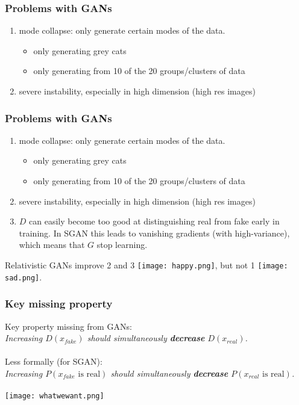 \documentclass[t]{beamer}
\begin{document}
\begin{frame}
	\frametitle{Problems with GANs}
	
	\begin{enumerate}
		\item mode collapse: only generate certain modes of the data.
		\begin{itemize}
			\item only generating grey cats
			\item only generating from 10 of the 20 groups/clusters of data
		\end{itemize}
		\item severe instability, especially in high dimension (high res images)
	\end{enumerate}
	
\end{frame}


\begin{frame}
	\frametitle{Problems with GANs}
	
	\begin{enumerate}
		\item mode collapse: only generate certain modes of the data.
		\begin{itemize}
			\item only generating grey cats
			\item only generating from 10 of the 20 groups/clusters of data
		\end{itemize}
		\item severe instability, especially in high dimension (high res images)
		\item $D$ can easily become too good at distinguishing real from fake early in training. In SGAN this leads to vanishing gradients (with high-variance), which means that $G$ stop learning.
	\end{enumerate}

	Relativistic GANs improve 2 and 3 \texttt{[image: happy.png]}, but not 1 \texttt{[image: sad.png]}. 
	
\end{frame}


\begin{frame}
	\frametitle{Key missing property}
	
	Key property missing from GANs: \\
	\textit{Increasing $D(x_{fake})$ should simultaneously \textbf{decrease} $D(x_{real})$.} \\~\\
	Less formally (for SGAN): \\
	\textit{Increasing $P(x_{fake} \text{ is real})$ should simultaneously \textbf{decrease} $P(x_{real} \text{ is real})$.} \\~\\
	\texttt{[image: whatwewant.png]}
	
\end{frame}
\end{document}
